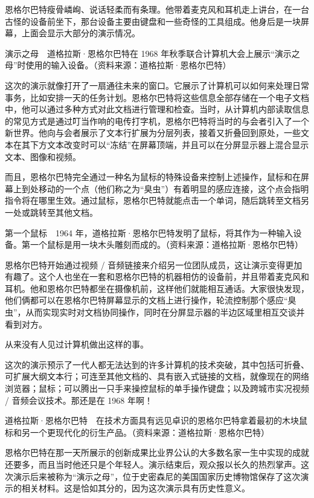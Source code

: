 \documentclass[12pt,UTF8]{ctexbook}
\begin{document}
恩格尔巴特瘦骨嶙峋、说话轻柔而有条理。他带着麦克风和耳机走上讲台，在一台古怪的设备前坐下，那台设备主要由键盘和一些奇怪的工具组成。他身后是一块屏幕，上面会显示大部分的演示情况。



演示之母　道格拉斯·恩格尔巴特在 1968 年秋季联合计算机大会上展示“演示之母”时使用的输入设备。（资料来源：道格拉斯·恩格尔巴特）

这次的演示就像打开了一扇通往未来的窗口。它展示了计算机可以如何来处理日常事务，比如安排一天的任务计划。恩格尔巴特将这些信息全部存储在一个电子文档中，他可以通过多种方式对此文档进行管理和检查。当时，从计算机内部读取信息的常见方式是通过叮当作响的电传打字机，恩格尔巴特将当时的与会者引入了一个新世界。他向与会者展示了文本行扩展为分层列表，接着又折叠回到原处，一些文本在其下方文本改变时可以“冻结”在屏幕顶端，并且可以在分屏显示器上混合显示文本、图像和视频。

而且，恩格尔巴特完全通过一种名为鼠标的特殊设备来控制上述操作，鼠标和在屏幕上到处移动的一个点（他们称之为“臭虫”）有着明显的感应连接，这个点会指明指令将在哪里生效。通过鼠标，恩格尔巴特就能点击一个单词，随后跳转至文档另一处或跳转至其他文档。



第一个鼠标　1964 年，道格拉斯·恩格尔巴特发明了鼠标，将其作为一种输入设备。第一个鼠标是用一块木头雕刻而成的。（资料来源：道格拉斯·恩格尔巴特）

恩格尔巴特开始通过视频 / 音频链接来介绍另一位团队成员，这让演示变得更加有趣了。这个人也坐在一套和恩格尔巴特的机器相仿的设备前，并且带着麦克风和耳机。他和恩格尔巴特都坐在摄像机前，这样他们就能相互通话。大家很快发现，他们俩都可以在恩格尔巴特屏幕显示的文档上进行操作，轮流控制那个感应“臭虫”，从而实现实时对文档协同操作，同时在分屏显示器的半边区域里相互交谈并看到对方。

从来没有人见过计算机做出这样的事。

这次的演示预示了一代人都无法达到的许多计算机的技术突破，其中包括可折叠、可扩展大纲文本行；可连至其他文档的、具有嵌入式链接的文档，就像现在的网络浏览器；鼠标；可以腾出一只手来操控鼠标的单手操作键盘；以及跨城市实况视频 / 音频会议技术。那还是在 1968 年啊！



道格拉斯·恩格尔巴特　在技术方面具有远见卓识的恩格尔巴特拿着最初的木块鼠标和另一个更现代化的衍生产品。（资料来源：道格拉斯·恩格尔巴特）

恩格尔巴特在那一天所展示的创新成果比业界公认的大多数名家一生中实现的成就还要多，而且当时他还只是个年轻人。演示结束后，观众报以长久的热烈掌声。这次演示后来被称为“演示之母”，位于史密森尼的美国国家历史博物馆保存了这次演示的相关材料。这是恰如其分的，因为这次演示具有历史性意义。
\end{document}
